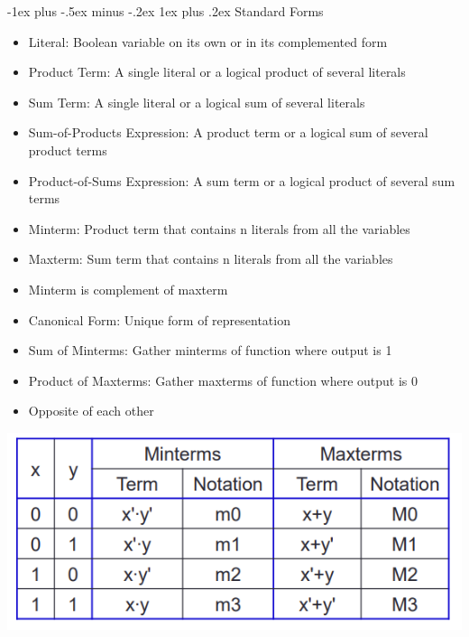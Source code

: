 \documentclass[10pt, portrait]{article}
\makeatletter
\renewcommand{\subsection}{\@startsection{subsection}{3}{0mm}%
                                {-1ex plus -.5ex minus -.2ex}%
                                {1ex plus .2ex}%
                                {\normalfont\small\bfseries}}%
\makeatother
\begin{document}
\begin{multicols*}{2}
\subsection{Standard Forms}
\begin{itemize}
    \item Literal: Boolean variable on its own or in its complemented form
    \item Product Term: A single literal or a logical product of several literals
    \item Sum Term: A single literal or a logical sum of several literals
    \item Sum-of-Products Expression: A product term or a logical sum of several product terms
    \item Product-of-Sums Expression: A sum term or a logical product of several sum terms
    \item Minterm: Product term that contains n literals from all the variables
    \item Maxterm: Sum term that contains n literals from all the variables
    \item Minterm is complement of maxterm
    \item Canonical Form: Unique form of representation
    \item Sum of Minterms: Gather minterms of function where output is 1
    \item Product of Maxterms: Gather maxterms of function where output is 0
    \item Opposite of each other
\end{itemize}

\begin{center}
    \includegraphics[width=0.7\linewidth]{terms.png}
\end{center}


\end{multicols*}
\end{document}
